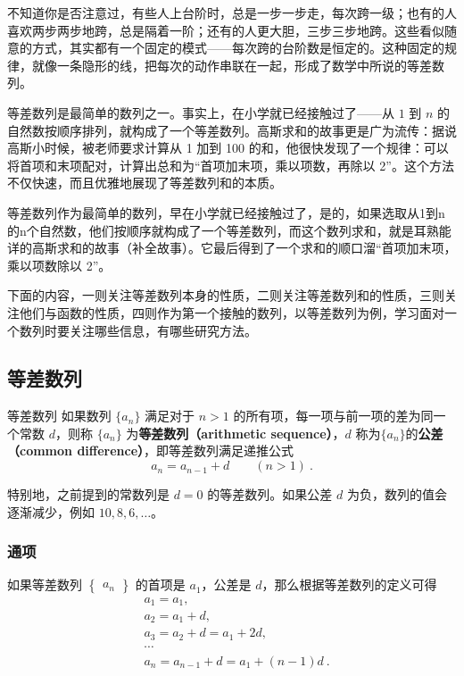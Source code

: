 
\begin{issues}
\issueDraft
\end{issues}


不知道你是否注意过，有些人上台阶时，总是一步一步走，每次跨一级；也有的人喜欢两步两步地跨，总是隔着一阶；还有的人更大胆，三步三步地跨。这些看似随意的方式，其实都有一个固定的模式——每次跨的台阶数是恒定的。这种固定的规律，就像一条隐形的线，把每次的动作串联在一起，形成了数学中所说的等差数列。

等差数列是最简单的数列之一。事实上，在小学就已经接触过了——从 $1$ 到  $n$  的自然数按顺序排列，就构成了一个等差数列。高斯求和的故事更是广为流传：据说高斯小时候，被老师要求计算从 1 加到 100 的和，他很快发现了一个规律：可以将首项和末项配对，计算出总和为“首项加末项，乘以项数，再除以 2”。这个方法不仅快速，而且优雅地展现了等差数列和的本质。

等差数列作为最简单的数列，早在小学就已经接触过了，是的，如果选取从1到n的n个自然数，他们按顺序就构成了一个等差数列，而这个数列求和，就是耳熟能详的高斯求和的故事（补全故事）。它最后得到了一个求和的顺口溜“首项加末项，乘以项数除以 2”。

下面的内容，一则关注等差数列本身的性质，二则关注等差数列和的性质，三则关注他们与函数的性质，四则作为第一个接触的数列，以等差数列为例，学习面对一个数列时要关注哪些信息，有哪些研究方法。

\subsection{等差数列}

\begin{definition}{等差数列}
如果数列 $\{a_n\}$ 满足对于 $n > 1$ 的所有项，每一项与前一项的差为同一个常数 $d$，则称 $\{a_n\}$ 为\textbf{等差数列（arithmetic sequence）}，$d$ 称为$\{a_n\}$的\textbf{公差（common difference）}，即等差数列满足递推公式
\begin{equation}
a_{n}=a_{n-1}+d\qquad(n>1)~.
\end{equation}
\end{definition}

特别地，之前提到的常数列是 $d = 0$ 的等差数列。如果公差 $d$ 为负，数列的值会逐渐减少，例如 $10, 8, 6, \dots$。

\subsubsection{通项}
如果等差数列 $\begin{Bmatrix} a_n \end{Bmatrix}$ 的首项是 $a_1$，公差是 $d$，那么根据等差数列的定义可得
\begin{equation}
\begin{aligned}
&a_1 = a_1,\\
&a_2 = a_1 + d,\\
&a_3 = a_2 + d = a_1 + 2d,\\
&\cdots \\
&a_n = a_{n-1} + d = a_1 + (n - 1)d~.
\end{aligned}
\end{equation}

